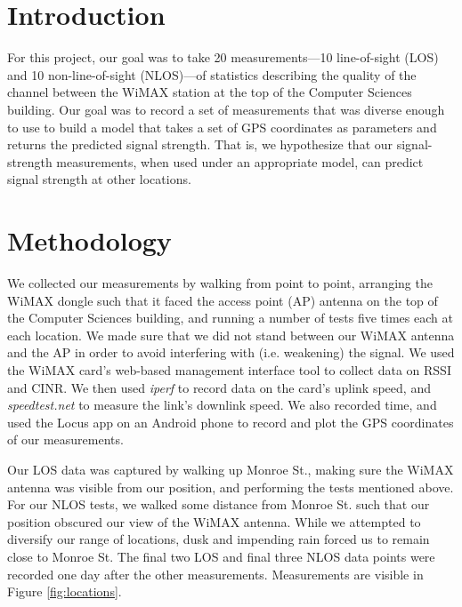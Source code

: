 \documentclass[12pt]{article}
\begin{document}
\maketitle


\section{Introduction}
For this project, our goal was to take 20 measurements---10 line-of-sight (LOS)
and 10 non-line-of-sight (NLOS)---of statistics describing the quality of the
channel between the WiMAX station at the top of the Computer Sciences building.
Our goal was to record a set of measurements that was diverse enough to use to
build a model that takes a set of GPS coordinates as parameters and returns the
predicted signal strength. That is, we hypothesize that our signal-strength
measurements, when used under an appropriate model, can predict signal strength
at other locations.

\section{Methodology} We collected our measurements by walking from point to
point, arranging the WiMAX dongle such that it faced the access point (AP)
antenna on the top of the Computer Sciences building, and running a number of
tests five times each at each location. We made sure that we did not stand
between our WiMAX antenna and the AP in order to avoid interfering with (i.e.
weakening) the signal.  We used the WiMAX card's web-based management interface
tool to collect data on RSSI and CINR. We then used \textit{iperf} to record
data on the card's uplink speed, and \textit{speedtest.net} to measure the
link's downlink speed. We also recorded time, and used the Locus app on an
Android phone to record and plot the GPS coordinates of our measurements.

Our LOS data was captured by walking up Monroe St., making sure the WiMAX
antenna was visible from our position, and performing the tests mentioned above.
For our NLOS tests, we walked some distance from Monroe St. such that our
position obscured our view of the WiMAX antenna. While we attempted to diversify
our range of locations, dusk and impending rain forced us to remain close to
Monroe St. The final two LOS and final three NLOS data points were recorded one
day after the other measurements. Measurements are visible in Figure
\ref{fig:locations}.
\end{document}
